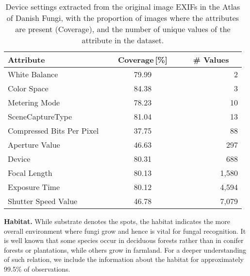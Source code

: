 \documentclass[10pt,twocolumn,letterpaper]{article}
\begin{document}
\begin{table}[b!]
\small
\vspace{-0.2cm}
\begin{center}
\renewcommand{\arraystretch}{1.1}
\setlength{\tabcolsep}{0.4em}
\begin{tabular}{|l|c|r|}
\hline
\textbf{Attribute} & \textbf{~~Coverage}\,[\%]~~ & \textbf{~~\# Values~~} \\
\hline
White Balance                 & 79.99 &     2 \\
Color Space                   & 84.38 &     3 \\
Metering Mode                 & 78.23 &    10 \\
SceneCaptureType              & 81.04 &    13 \\
Compressed Bits Per Pixel\,\, & 37.75 &    88 \\
Aperture Value                & 46.63 &   297 \\
Device                        & 80.31 &   688 \\
Focal Length                  & 80.13 & 1,580 \\
Exposure Time                 & 80.12 & 4,594 \\
Shutter Speed Value           & 46.78 & 7,079 \\
\hline
\end{tabular}
\end{center}
\caption{Device settings extracted from the original image EXIFs in the Atlas of Danish Fungi, with the proportion of images where the attributes are present (Coverage), and the number of unique values of the attribute in the dataset.}
\label{table:exif_values}
\end{table}

\textbf{Habitat.} While substrate denotes the spots, the habitat indicates the more overall environment where fungi grow and hence is vital for fungal recognition. It is well known that some species occur in deciduous forests rather than in conifer forests or plantations, while others grow in farmland. For a deeper understanding of such relation, we include the information about the habitat for approximately 99.5\% of observations.
\end{document}
